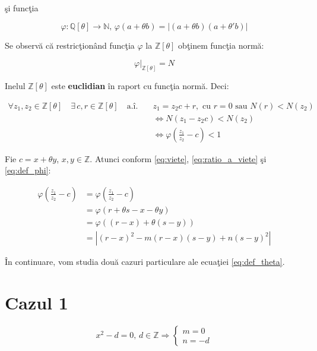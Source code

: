 \documentclass[12pt]{article}
\begin{document}
şi funcţia

\begin{equation} \label{eq:def_phi}
    \varphi : \mathbb{Q}[\theta] \to \mathbb{N}, \, \varphi(a + \theta b) = |(a + \theta b)(a + \theta' b)|
\end{equation}

Se observă că restricţionând funcţia $\varphi$ la $\mathbb{Z}[\theta]$ obţinem funcţia normă:

\begin{equation} \label{eq:phi_restricted_z}
    \left.\varphi\right|_{\mathbb{Z}[\theta]} = N
\end{equation}

Inelul $\mathbb{Z}[\theta]$ este \textbf{euclidian} în raport cu funcţia normă. Deci:

\begin{equation} \label{eq:z_theta_euclidean}
    \begin{split}
	\forall z_1, z_2 \in \mathbb{Z}[\theta] \quad \exists \, c, r \in \mathbb{Z}[\theta] \quad \text{a.î.} \quad
        & z_1 = z_2 c + r, \text{ cu } r = 0 \text{ sau } N(r) < N(z_2) \\
        &\Leftrightarrow N(z_1 - z_2 c) < N(z_2) \\
        &\Leftrightarrow \varphi \left(\frac{z_1}{z_2} - c\right) < 1
    \end{split}
\end{equation}

Fie $c = x + \theta y$, $x, y \in \mathbb{Z}$.
Atunci conform \eqref{eq:viete}, \eqref{eq:ratio_a_viete} şi \eqref{eq:def_phi}:

\begin{equation} \label{eq:phi_condition}
\begin{split}
    \varphi  \left(\frac{z_1}{z_2} - c\right) & =\varphi  \left(\frac{z_1}{z_2} - c\right) \\
    &=\varphi(r + \theta s - x - \theta y) \\
    &= \varphi \left( (r-x) + \theta(s-y) \right) \\
    &=  \left| (r-x)^2 - m(r-x)(s-y) + n(s-y)^2\right|
\end{split}
\end{equation}

În continuare, vom studia două cazuri particulare ale ecuaţiei \eqref{eq:def_theta}.

\section*{Cazul 1} 
\begin{equation} \label{eq:case_1}
    x^2 - d = 0, \, d \in \mathbb{Z} \Rightarrow \begin{cases} m = 0 \\ n = -d \end{cases}
\end{equation}
\end{document}
